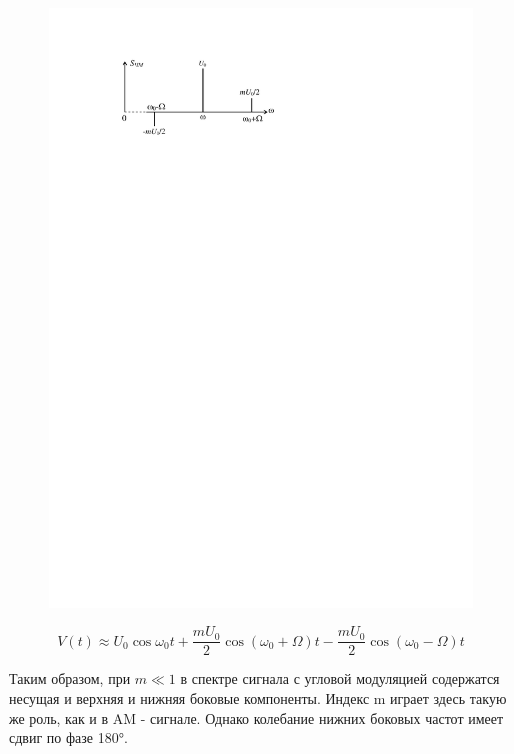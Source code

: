 \begin{figure}[h!]
	\centering
	\includegraphics[]{fig/fig2-4}
	\caption{}
	\label{fig:2.4}
\end{figure}

\begin{equation}
	V(t) \approx U_{0} \cos \omega_{0} t+\frac{m U_{0}}{2} \cos \left(\omega_{0}+\Omega\right) t-\frac{m U_{0}}{2} \cos \left(\omega_{0}-\Omega\right) t
\end{equation}


Таким образом, при $m\ll 1$ в спектре сигнала с угловой модуляцией содержатся несущая и верхняя и нижняя боковые компоненты. Индекс m играет здесь такую же роль, как и в AM - сигнале.
Однако колебание нижних боковых частот имеет сдвиг по фазе 180°.


